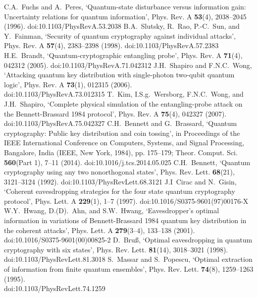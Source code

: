 \documentclass[12pt]{article}
\begin{document}
\begin{thebibliography}{99}
%
C.A.~Fuchs and A.~Peres,
`Quantum-state disturbance versus information gain:
Uncertainty relations for quantum information',
Phys. Rev. A {\bf 53}(4), 2038--2045 (1996).
doi:10.1103/PhysRevA.53.2038
%
B.A.~Slutsky, R.~Rao, P.-C.~Sun, and Y.~Fainman,
`Security of quantum cryptography against individual attacks',
Phys. Rev. A {\bf 57}(4), 2383--2398 (1998).
doi:10.1103/PhysRevA.57.2383
%
H.E.~Brandt,
`Quantum-cryptographic entangling probe',
Phys. Rev. A {\bf 71}(4), 042312 (2005).
doi:10.1103/PhysRevA.71.042312
%
J.H.~Shapiro and F.N.C.~Wong,
`Attacking quantum key distribution with single-photon two-qubit quantum logic',
Phys. Rev. A {\bf 73}(1), 012315 (2006).
\\
doi:10.1103/PhysRevA.73.012315
%
T.~Kim, I.S.g.~Wersborg, F.N.C.~Wong, and J.H.~Shapiro,
`Complete physical simulation of the entangling-probe attack on the Bennett-Brassard 1984 protocol',
Phys. Rev. A {\bf 75}(4), 042327 (2007).
doi:10.1103/PhysRevA.75.042327
%
C.H.~Bennett and G.~Brassard,
`Quantum cryptography: Public key distribution and coin tossing',
in Proceedings of the IEEE International Conference on Computers, Systems, and Signal Processing, Bangalore, India (IEEE, New York, 1984), pp. 175--179;
Theor. Comput. Sci. {\bf 560}(Part 1), 7--11 (2014).
doi:10.1016/j.tcs.2014.05.025
%
C.H.~Bennett,
`Quantum cryptography using any two nonorthogonal states',
Phys. Rev. Lett. {\bf 68}(21), 3121--3124 (1992).
doi:10.1103/PhysRevLett.68.3121
%
J.I~Cirac and N.~Gisin,
`Coherent eavesdropping strategies for the four state quantum cryptography protocol',
Phys. Lett. A {\bf 229}(1), 1--7 (1997).
doi:10.1016/S0375-9601(97)00176-X
%
W.Y.~Hwang, D.(D).~Ahn, and S.W.~Hwang,
`Eavesdropper's optimal information in variations of Bennett-Brassard 1984 quantum key distribution in the coherent attacks',
Phys. Lett. A {\bf 279}(3--4), 133--138 (2001).
doi:10.1016/S0375-9601(00)00825-2
%
D.~Bru{\ss},
`Optimal eavesdropping in quantum cryptography with six states',
Phys. Rev. Lett. {\bf 81}(14), 3018--3021 (1998).
doi:10.1103/PhysRevLett.81.3018
%
S.~Massar and S.~Popescu,
`Optimal extraction of information from finite quantum ensembles',
Phys. Rev. Lett. {\bf 74}(8), 1259--1263 (1995).
\\
doi:10.1103/PhysRevLett.74.1259
%

\end{thebibliography}
\end{document}
